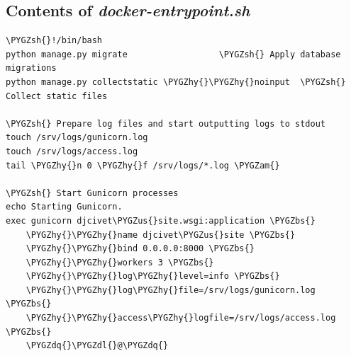\documentclass[letterpaper,10pt,english]{sphinxmanual}
\def\PYGZbs{\char`\\}
\def\PYGZus{\char`\_}
\def\PYGZam{\char`\&}
\def\PYGZsh{\char`\#}
\def\PYGZdl{\char`\$}
\def\PYGZhy{\char`\-}
\def\PYGZdq{\char`\"}
\begin{document}
\subsection{Contents of \emph{docker-entrypoint.sh}}
\label{appendix4:contents-of-docker-entrypoint-sh}
\begin{Verbatim}[commandchars=\\\{\}]
\PYGZsh{}!/bin/bash
python manage.py migrate                  \PYGZsh{} Apply database migrations
python manage.py collectstatic \PYGZhy{}\PYGZhy{}noinput  \PYGZsh{} Collect static files

\PYGZsh{} Prepare log files and start outputting logs to stdout
touch /srv/logs/gunicorn.log
touch /srv/logs/access.log
tail \PYGZhy{}n 0 \PYGZhy{}f /srv/logs/*.log \PYGZam{}

\PYGZsh{} Start Gunicorn processes
echo Starting Gunicorn.
exec gunicorn djcivet\PYGZus{}site.wsgi:application \PYGZbs{}
    \PYGZhy{}\PYGZhy{}name djcivet\PYGZus{}site \PYGZbs{}
    \PYGZhy{}\PYGZhy{}bind 0.0.0.0:8000 \PYGZbs{}
    \PYGZhy{}\PYGZhy{}workers 3 \PYGZbs{}
    \PYGZhy{}\PYGZhy{}log\PYGZhy{}level=info \PYGZbs{}
    \PYGZhy{}\PYGZhy{}log\PYGZhy{}file=/srv/logs/gunicorn.log \PYGZbs{}
    \PYGZhy{}\PYGZhy{}access\PYGZhy{}logfile=/srv/logs/access.log \PYGZbs{}
    \PYGZdq{}\PYGZdl{}@\PYGZdq{}
\end{Verbatim}
\end{document}
